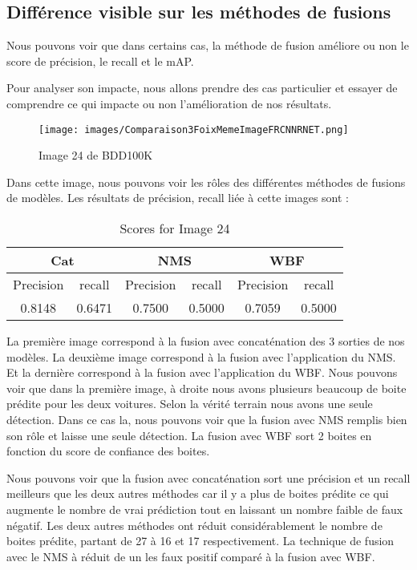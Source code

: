 \documentclass{article}
\begin{document}
\subsection{Différence visible sur les méthodes de fusions}
Nous pouvons voir que dans certains cas, la méthode de fusion améliore ou non le score de précision, le recall et le mAP. 


Pour analyser son impacte, nous allons prendre des cas particulier et essayer de comprendre ce qui impacte ou non l'amélioration de nos résultats.


\begin{figure}[htp]
    \centering
    \texttt{[image: images/Comparaison3FoixMemeImageFRCNNRNET.png]}
    \caption{Image 24 de BDD100K}
    \label{fig:galaxy}
\end{figure}


Dans cette image, nous pouvons voir les rôles des différentes méthodes de fusions de modèles. Les résultats de précision, recall liée à cette images sont :

\begin{table}[h!]
    \centering
    \begin{tabular}{|c|c|c|c|c|c|}
        \hline
        \multicolumn{2}{|c|}{Cat} &\multicolumn{2}{|c|}{NMS} & \multicolumn{2}{|c|}{WBF} \\
        \hline 
         Precision & recall & Precision & recall & Precision & recall \\
         \hline 
         0.8148 & 0.6471 & 0.7500 & 0.5000 & 0.7059 & 0.5000 \\ 
    \hline
    \end{tabular}
    \caption{Scores for Image 24}
    \label{tab:my_label}
\end{table}

La première image correspond à la fusion avec concaténation des 3 sorties de nos modèles. La deuxième image correspond à la fusion avec l'application du NMS. Et la dernière correspond à la fusion avec l'application du WBF.
Nous pouvons voir que dans la première image, à droite nous avons plusieurs beaucoup de boite prédite pour les deux voitures. Selon la vérité terrain nous avons une seule détection. Dans ce cas la, nous pouvons voir que la fusion avec NMS remplis bien son rôle et laisse une seule détection. La fusion avec WBF sort 2 boites en fonction du score de confiance des boites. 

Nous pouvons voir que la fusion avec concaténation sort une précision et un recall meilleurs que les deux autres méthodes car il y a plus de boites prédite ce qui augmente le nombre de vrai prédiction tout en laissant un nombre faible de faux négatif. Les deux autres méthodes ont réduit considérablement le nombre de boites prédite, partant de 27 à 16 et 17 respectivement. La technique de fusion avec le NMS à réduit de un les faux positif comparé à la fusion avec WBF.
\end{document}
